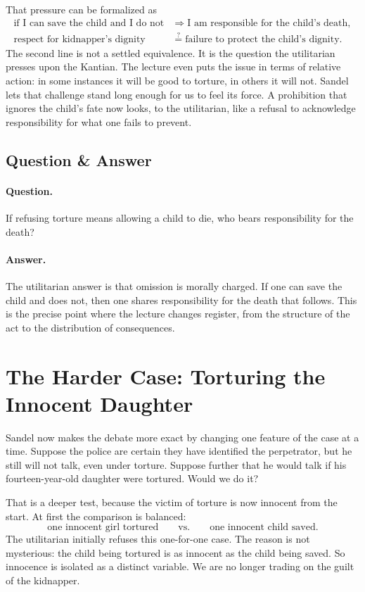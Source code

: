 That pressure can be formalized as
\begin{align}
\text{if I can save the child and I do not}
&\Longrightarrow
\text{I am responsible for the child's death},\\
\text{respect for kidnapper's dignity}
&\stackrel{?}{=}
\text{failure to protect the child's dignity}.
\end{align}
The second line is not a settled equivalence. It is the question the utilitarian presses upon the Kantian. The lecture even puts the issue in terms of relative action: in some instances it will be good to torture, in others it will not. Sandel lets that challenge stand long enough for us to feel its force. A prohibition that ignores the child's fate now looks, to the utilitarian, like a refusal to acknowledge responsibility for what one fails to prevent.

\subsection{Question \& Answer}

\paragraph{Question.} If refusing torture means allowing a child to die, who bears responsibility for the death?

\paragraph{Answer.} The utilitarian answer is that omission is morally charged. If one can save the child and does not, then one shares responsibility for the death that follows. This is the precise point where the lecture changes register, from the structure of the act to the distribution of consequences.

\section{The Harder Case: Torturing the Innocent Daughter}

Sandel now makes the debate more exact by changing one feature of the case at a time. Suppose the police are certain they have identified the perpetrator, but he still will not talk, even under torture. Suppose further that he would talk if his fourteen-year-old daughter were tortured. Would we do it?

That is a deeper test, because the victim of torture is now innocent from the start. At first the comparison is balanced:
\begin{equation}
\text{one innocent girl tortured}
\qquad \text{vs.} \qquad
\text{one innocent child saved}.
\end{equation}
The utilitarian initially refuses this one-for-one case. The reason is not mysterious: the child being tortured is as innocent as the child being saved. So innocence is isolated as a distinct variable. We are no longer trading on the guilt of the kidnapper.

